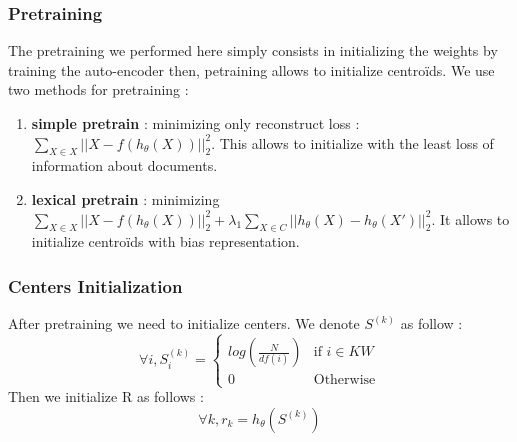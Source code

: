 \subsubsection{Pretraining}\label{sec:pre}
The pretraining we performed here simply consists in initializing the weights by training 
the auto-encoder then, petraining allows to initialize centroïds.
We use two methods for pretraining : 
\begin{enumerate} 
\item \textbf{simple pretrain} : minimizing only reconstruct loss :
  $\sum\limits_{X \in X} || X - f(h_\theta(X))||_2^2$. This allows to 
  initialize with the least loss of information about documents.   
\item \textbf{lexical pretrain} : minimizing $\sum\limits_{X \in X} || X - f(h_\theta(X))||_2^2 + 
  \lambda_1 \sum\limits_{X \in C} || h_\theta(X) - h_\theta(X')||_2^2$. 
  It allows to initialize centroïds with bias representation.
\end{enumerate}

\subsubsection{Centers Initialization}
After pretraining we need to initialize centers. We denote $S^{(k)}$ as follow :
\begin{equation}
\forall i, S^{(k)}_i = \left\{
    \begin{array}{ll}
        log\left(\frac{N}{df(i)}\right) & \mbox{if } i \in KW \\
        0 & \mbox{Otherwise}
    \end{array}
\right.
\end{equation}
Then we initialize R as follows :
\begin{equation}
\forall k, r_k =  h_\theta(S^{(k)})
\end{equation}
